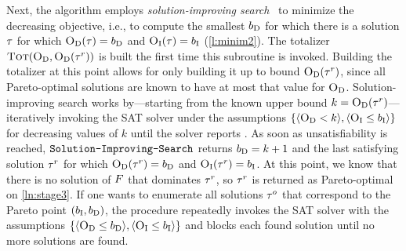 Next, the algorithm employs \emph{solution-improving search}~\autocites{handbook2-maxsat,DBLP:journals/jsat/BerreP10,DBLP:journals/jsat/EenS06} to minimize the decreasing objective, i.e., to compute the smallest $b_{\text{D}}$ for which there is a solution $\tau$ for which $\textsc{O}_{\text{D}}(\tau) = b_{\text{D}}$ and $\textsc{O}_{\text{I}}(\tau) = b_{\text{I}}$ (\cref{l:minim2}).
The totalizer $\textsc{Tot}(\textsc{O}_{\text{D}}, \textsc{O}_{\text{D}}(\tau^r))$ is built the first time this subroutine is invoked.
Building the totalizer at this point allows for only building it up to bound $\textsc{O}_{\text{D}}(\tau^r)$, since all Pareto-optimal solutions are known to have at most that value for $\textsc{O}_{\text{D}}$.
Solution-improving search works by---starting from the known upper bound $k=\textsc{O}_{\text{D}}(\tau^r)$---iteratively invoking the SAT solver under the assumptions $\{\langle \textsc{O}_{\text{D}} < k \rangle, \langle \textsc{O}_{\text{I}} \leq b_{\text{I}} \rangle\}$ for decreasing values of $k$ until the solver reports \unsat{}.
As soon as unsatisfiability is reached, $\texttt{Solution-\allowbreak{}Improving-\allowbreak{}Search}$ returns $b_{\text{D}}=k+1$ and the last satisfying solution $\tau^r$ for which $\textsc{O}_{\text{D}}(\tau^r) = b_{\text{D}}$ and $\textsc{O}_{\text{I}}(\tau^r) = b_{\text{I}}$.
At this point, we know that there is no solution of $F$ that dominates $\tau^r$, so $\tau^r$ is returned as Pareto-optimal on \cref{ln:stage3}.
If one wants to enumerate all solutions $\tau^o$ that correspond to the Pareto point $(b_{\text{I}},b_{\text{D}})$, the \E{} procedure repeatedly invokes the SAT solver with the assumptions $\{\langle \textsc{O}_{\text{D}} \leq b_{\text{D}} \rangle, \langle \textsc{O}_{\text{I}} \leq b_{\text{I}} \rangle\}$ and blocks each found solution until no more solutions are found.

